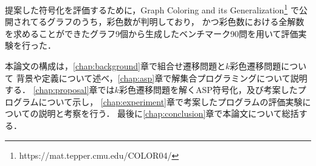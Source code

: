 提案した符号化を評価するために，Graph Coloring and its Generalization\footnote{https://mat.tepper.cmu.edu/COLOR04/}
で公開されてるグラフのうち，彩色数が判明しており，
かつ彩色数における全解数を求めることができたグラフ9個から生成したベンチマーク90問を用いて評価実験を行った．

本論文の構成は，\ref{chap:background}章で組合せ遷移問題と$k$彩色遷移問題について
背景や定義について述べ，\ref{chap:asp}章で解集合プログラミングについて説明する．
\ref{chap:proposal}章では$k$彩色遷移問題を解くASP符号化，及び考案したプログラムについて示し，
\ref{chap:experiment}章で考案したプログラムの評価実験についての説明と考察を行う．
最後に\ref{chap:conclusion}章で本論文について総括する．

